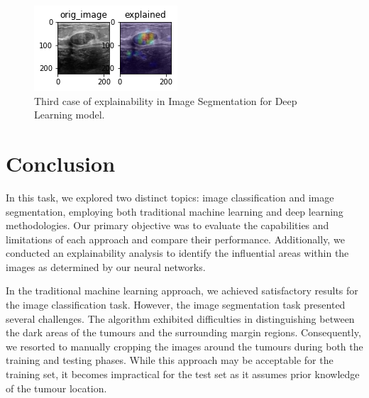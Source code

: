   	\begin{figure}
  		\includegraphics[width=\linewidth]{Figures/segment_explained_dl_3.png}
  		\caption{Third case of explainability in Image Segmentation for Deep Learning model.}
		\label{Figure - DL_Segmentation explainability Third case of Image Segmentation}
  	\end{figure}


\section{Conclusion}
In this task, we explored two distinct topics: image classification and image segmentation, employing both traditional machine learning and deep learning methodologies. Our primary objective was to evaluate the capabilities and limitations of each approach and compare their performance. Additionally, we conducted an explainability analysis to identify the influential areas within the images as determined by our neural networks.

In the traditional machine learning approach, we achieved satisfactory results for the image classification task. However, the image segmentation task presented several challenges. The algorithm exhibited difficulties in distinguishing between the dark areas of the tumours and the surrounding margin regions. Consequently, we resorted to manually cropping the images around the tumours during both the training and testing phases. While this approach may be acceptable for the training set, it becomes impractical for the test set as it assumes prior knowledge of the tumour location.

